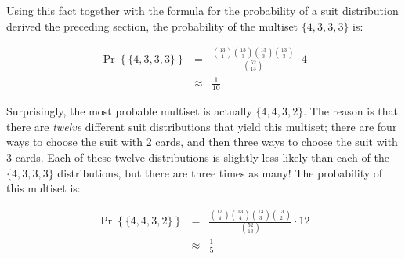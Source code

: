 \documentclass[twoside,12pt]{article}
\newcommand{\beqn}{\begin{eqnarray*}}
\newcommand{\eeqn}{\end{eqnarray*}}
\newcommand{\pr}[1]{\Pr\left\{#1\right\}}
\begin{document}
\noindent Using this fact together with the formula for the
probability of a suit distribution derived the preceding section, the
probability of the multiset $\{ 4, 3, 3, 3 \}$ is:

\beqn
\pr{\{4, 3, 3, 3\}} & = &
    \frac{\binom{13}{4}\binom{13}{3}\binom{13}{3}\binom{13}{3}}{\binom{52}{13}}
    \cdot 4 \\
    & \approx & \frac{1}{10}
\eeqn

Surprisingly, the most probable multiset is actually $\{4, 4, 3, 2\}$.
The reason is that there are {\em twelve} different suit distributions
that yield this multiset; there are four ways to choose the suit with
2 cards, and then three ways to choose the suit with 3 cards.  Each of
these twelve distributions is slightly less likely than each of the
$\{4, 3, 3, 3\}$ distributions, but there are three times as many!
The probability of this multiset is:

\beqn
\pr{\{4, 4, 3, 2\}} & = &
    \frac{\binom{13}{4}\binom{13}{4}\binom{13}{3}\binom{13}{2}}{\binom{52}{13}}
    \cdot 12 \\
    & \approx & \frac{1}{5}
\eeqn
\end{document}

